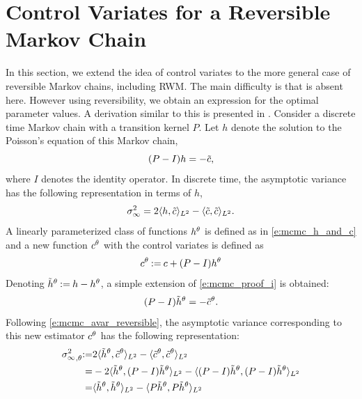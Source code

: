 \section{Control Variates for a Reversible Markov Chain} 
\label{s:mcmc_reversible_mc_cv}
In this section, we extend the idea of control variates to the more general case of reversible Markov chains, including RWM. The main difficulty is that  is absent here. However using reversibility, we obtain an expression for the optimal parameter values. A derivation similar to this is presented in \cite{delkon12}.
Consider a discrete time Markov chain with a transition kernel $P$.  Let $h$ denote the solution to the Poisson's equation of this Markov chain,
\[
(P - I) h = -\tilde c,
\]
where $I$ denotes the identity operator.
In discrete time, the asymptotic variance has the following representation in terms of $h$,
\begin{equation}
\asymvar = 2 \langle h, \tilc \rangle_{L^2} - \langle \tilc, \tilc \rangle_{L^2}.
\label{e:mcmc_avar_reversible}
\end{equation}
A linearly parameterized class of functions $h^\theta$ is defined as in \eqref{e:mcmc_h_and_c} and a new function $c^\theta$ with the control variates is defined as
\begin{equation}
c^\param \eqdef c +  (P - I) h^\param
\label{e:mcmc_discrete_cv}
\end{equation}
Denoting $\tilde h^\theta \mathbin{:=} h - h^\theta$, a simple extension of \eqref{e:mcmc_proof_i} is obtained:
\begin{equation}
(P - I) \tilh^\param = -\tilc^\param.
\label{e:mcmc_discrete_poissons_cv}
\end{equation}
Following \eqref{e:mcmc_avar_reversible}, the asymptotic variance corresponding to this new estimator $c^\theta$ has the following representation:
\begin{equation}
\begin{aligned}
{\asymvar}_{,\param} \eqdef & 2 \langle \tilh^\param, \tilc^\param \rangle_{L^2} - \langle \tilc^\param, \tilc^\param \rangle_{L^2}\\
= &  - 2 \langle \tilh^\param, (P - I) \tilh^\param \rangle_{L^2} -\langle (P - I) \tilh^\param, (P - I) \tilh^\param \rangle_{L^2}\\
= & \langle \tilh^\param, \tilh^\param \rangle_{L^2} - \langle P \tilh^\param, P \tilh^\param \rangle_{L^2}
\label{e:mcmc_asym_var_theta_discrete}
\end{aligned}
\end{equation}
